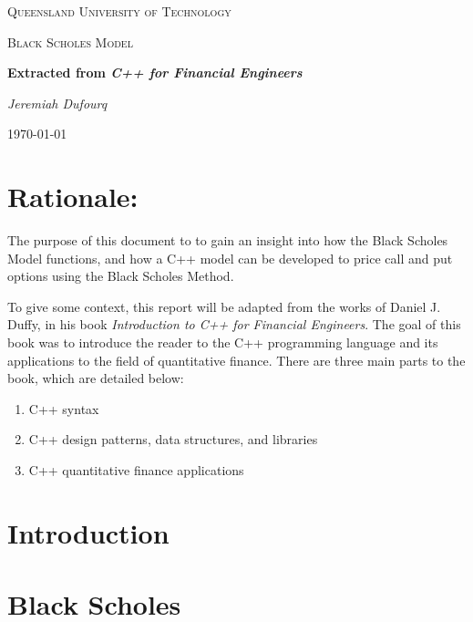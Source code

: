 \documentclass[12pt]{article}
\author{Jeremiah Dufourq}
\begin{document}
	\begin{titlepage}
		\centering
		
		
		{\scshape\LARGE Queensland University of Technology \par}
		\vspace{5cm}
		{\scshape\Large Black Scholes Model\par}
		\vspace{1.5cm}
		{\huge\bfseries Extracted from \textit{C++ for Financial Engineers}\par}
		\vspace{2cm}
		{\Large\itshape Jeremiah Dufourq\par}
		
		{\large \today\par}
	\end{titlepage}
	
	
	\newpage
	\tableofcontents
	\newpage
	
	
	\section{Rationale:}
	The purpose of this document to to gain an insight into how the Black Scholes Model functions, and how a C++ model can be developed to price call and put options using the Black Scholes Method. 
	
	To give some context, this report will be adapted from the works of Daniel J. Duffy, in his book \textit{Introduction to C++ for Financial Engineers}. The goal of this book was to introduce the reader to the C++ programming language and its applications to the field of quantitative finance. There are three main parts to the book, which are detailed below:
	
	\begin{enumerate}
		\item C++ syntax 
		\item C++ design patterns, data structures, and libraries
		\item C++ quantitative finance applications
	\end{enumerate}
	
	\section{Introduction}
	
	\section{Black Scholes}
	
\end{document}
